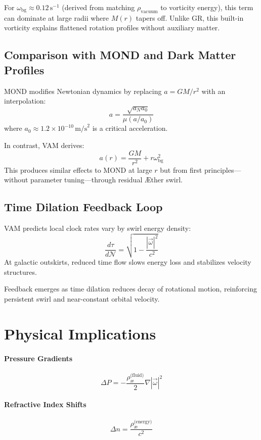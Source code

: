 \documentclass[12pt]{article}
\begin{document}
    For $\omega_{\text{bg}} \approx 0.12 \, \text{s}^{-1}$ (derived from matching $\rho_{\text{vacuum}}$ to vorticity energy), this term can dominate at large radii where $M(r)$ tapers off. Unlike GR, this built-in vorticity explains flattened rotation profiles without auxiliary matter.

    \subsection{Comparison with MOND and Dark Matter Profiles}

    MOND modifies Newtonian dynamics by replacing $a = GM/r^2$ with an interpolation:
    \[
        a = \frac{\sqrt{a_N a_0}}{\mu(a/a_0)}
    \]
    where $a_0 \approx 1.2 \times 10^{-10} \, \text{m/s}^2$ is a critical acceleration.

    In contrast, VAM derives:
    \[
        a(r) = \frac{G M}{r^2} + r \omega_{\text{bg}}^2
    \]
    This produces similar effects to MOND at large $r$ but from first principles—without parameter tuning—through residual \AE{}ther swirl.

    \subsection{Time Dilation Feedback Loop}

    VAM predicts local clock rates vary by swirl energy density:
    \[
        \frac{d\tau}{d\mathcal{N}} = \sqrt{1 - \frac{|\vec{\omega}|^2}{c^2}}
    \]
    At galactic outskirts, reduced time flow slows energy loss and stabilizes velocity structures.

    Feedback emerges as time dilation reduces decay of rotational motion, reinforcing persistent swirl and near-constant orbital velocity.

    \section{Physical Implications}

    \paragraph{Pressure Gradients}
    \[
        \Delta P = -\frac{\rho_{\text{\ae}}^{\text{(fluid)}}}{2} \nabla |\vec{\omega}|^2
    \]

    \paragraph{Refractive Index Shifts}
    \[
        \Delta n = \frac{\rho_{\text{\ae}}^{\text{(energy)}}}{c^2}
    \]
\end{document}
